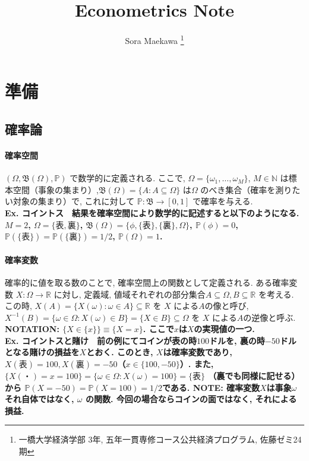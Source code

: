 \documentclass[paper=a4paper,fontsize=10pt]{jlreq}
\begin{document}
\title{Econometrics Note}
\author{
  Sora Maekawa \thanks{一橋大学経済学部 3年, 五年一貫専修コース公共経済プログラム, 佐藤ゼミ24期}
}
\maketitle

\section{準備}
\subsection{確率論}
\paragraph{確率空間}
$( \Omega, \mathfrak{B} (\Omega), \mathbb{P} )$ で数学的に定義される. ここで, $ \Omega= \{\omega_1, \dots, \omega_M\} $, $M \in \mathbb{N} $ は標本空間（事象の集まり）,$\mathfrak{B} (\Omega)=\{A:A\subseteq{\Omega} \}$ は$\Omega$ のべき集合（確率を測りたい対象の集まり）で, これに対して $\mathbb{P}:\mathfrak{B}\rightarrow [0,1]$ で確率を与える.\\

\rmfamily\mcfamily\bfseries{Ex. コイントス}\mdseries　結果を確率空間により数学的に記述すると以下のようになる. $M=2$, $\Omega=\{表, 裏\}$, $\mathfrak{B}(\Omega)=\{\phi, \{表\}, \{裏\}, \Omega\}$, $\mathbb{P}(\phi)=0$, $\mathbb{P}(\{表\})=\mathbb{P}(\{裏\})=1/2$, $\mathbb{P}(\Omega)=1$.\\

\paragraph{確率変数}
確率的に値を取る数のことで, 確率空間上の関数として定義される. ある確率変数 $X:\Omega\rightarrow\mathbb{R}$ に対し, 定義域, 値域それぞれの部分集合$A\subseteq\Omega, B\subseteq\mathbb{R}$ を考える. この時, $X(A)=\{X(\omega):\omega\in A\}\subseteq \mathbb{R}$ を $X$ による$A$の像と呼び, $X^{-1}(B)=\{\omega\in \Omega:X(\omega)\in B\}=\{X\in B\}\subseteq \Omega$ を $X$ による$A$の逆像と呼ぶ. \rmfamily\mcfamily\bfseries{NOTATION}\mdseries : $ \{ X \in \{x\} \} \equiv \{ X=x \} $. ここで$x$は$X$の実現値の一つ.\\

\rmfamily\mcfamily\bfseries{Ex. コイントスと賭け}\mdseries　前の例にてコインが表の時$100$ドルを, 裏の時$-50$ドルとなる賭けの損益を$X$とおく. このとき, $X$は確率変数であり, $X(表)=100, X(裏)=-50$（$x\in\{100, -50\}$）. また, $\{X(・) = x = 100\}=\{\omega\in\Omega:X(\omega)=100\}=\{表\}$ （裏でも同様に記せる）から $\mathbb{P}(X=-50)=\mathbb{P}(X=100)=1/2$である. \rmfamily\mcfamily\bfseries{NOTE}\mdseries : 確率変数$X$は事象$\omega$それ自体ではなく, $\omega$ の関数. 今回の場合ならコインの面ではなく, それによる損益.\\
\end{document}

